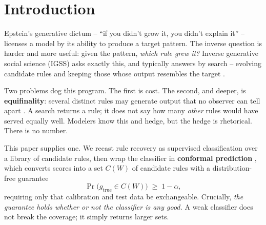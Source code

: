 \documentclass[11pt]{article}
\begin{document}
\begin{abstract}
Finally we transfer the simulation-trained library onto \textbf{physical robots}
programmed with the same rules. It largely fails ($0.375$), and the reason matters:
robots executing a given rule school $1.7\times$ less tightly than simulated agents
executing it, so the classifier reads their behavior correctly and infers the wrong
rule. Rule identification recovers the \emph{effective} rule of the substrate the
library was built on, not the \emph{programmed} one. Transporting the conformal
calibration across this shift fails silently -- $47\%$ coverage while promising
$95\%$ -- whereas recalibrating on a handful of robot runs restores validity and
returns sets containing 10 of 11 rules: the framework correctly reporting that it
cannot identify the mechanism. \textbf{Conformal prediction guarantees honesty, not
competence.}
\end{abstract}

\section{Introduction}

Epstein's generative dictum -- ``if you didn't grow it, you didn't explain it'' --
licenses a model by its ability to produce a target pattern. The inverse question is
harder and more useful: given the pattern, \emph{which rule grew it?} Inverse
generative social science (IGSS) asks exactly this, and typically answers by search
-- evolving candidate rules and keeping those whose output resembles the target
\citep{gunaratne2020,gunaratne2023,epstein2023}.

Two problems dog this program. The first is cost. The second, and deeper, is
\textbf{equifinality}: several distinct rules may generate output that no observer
can tell apart \citep{beven2006}. A search returns a rule; it does not say how many
\emph{other} rules would have served equally well. Modelers know this and hedge, but
the hedge is rhetorical. There is no number.

This paper supplies one. We recast rule recovery as supervised classification over a
library of candidate rules, then wrap the classifier in \textbf{conformal
prediction} \citep{vovk2005,angelopoulos2021}, which converts scores into a set
$C(W)$ of candidate rules with a distribution-free guarantee
%
\begin{equation}
\Pr\bigl(g_{\text{true}} \in C(W)\bigr) \;\ge\; 1-\alpha ,
\label{eq:coverage}
\end{equation}
%
requiring only that calibration and test data be exchangeable. Crucially,
\emph{the guarantee holds whether or not the classifier is any good.} A weak
classifier does not break the coverage; it simply returns larger sets.
\end{document}
